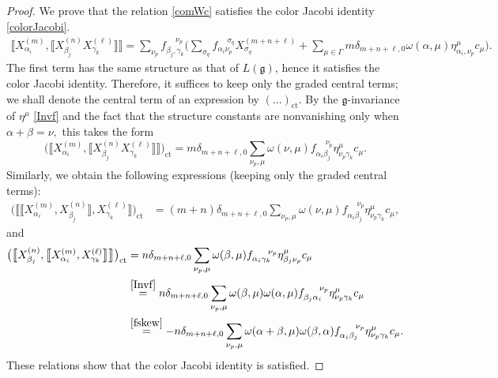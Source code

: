 \documentclass[pdftex]{sigma}
\numberwithin{equation}{section}
\theoremstyle{definition}
\def\nn{\notag}
\def\g{\mathfrak{g}}
\begin{document}
\begin{proof}
	We prove that the relation \eqref{comWc} satisfies the color Jacobi identity \eqref{colorJacobi}.
	\begin{align*}
		\llbracket X_{\alpha_i}^{(m)}, \llbracket X_{\beta_j}^{(n)} X_{\gamma_k}^{(\ell)} \rrbracket \rrbracket
		 = \sum_{\nu_p} f_{\beta_j,\gamma_k}^{\quad \ \nu_p}
		\biggl( \sum_{\sigma_q} f_{\alpha_i \nu_p}^{\quad\ \sigma_q} X_{\sigma_q}^{(m+n+\ell)} + \sum_{\mu \in \Gamma} m \delta_{m+n+\ell,0} \omega(\alpha,\mu) \eta_{\alpha_i,\nu_p}^{\mu} c_{\mu} \biggr).
	\end{align*}
	The first term has the same structure as that of $L(\g)$, hence it satisfies the color Jacobi identity.
	Therefore, it suffices to keep only the graded central terms;
	we shall denote the central term of an expression by $(\ldots)_{\mathrm{ct}}$.
	By the $\g$-invariance of $\eta^{\mu} $ \eqref{Invf} and the fact that the structure constants are nonvanishing only when $ \alpha + \beta = \nu, $ this takes the form
	\begin{equation*}
		\bigl(\bigl\llbracket X_{\alpha_i}^{(m)}, \bigl\llbracket X_{\beta_j}^{(n)} X_{\gamma_k}^{(\ell)} \bigr\rrbracket \bigr\rrbracket \bigr)_{\mathrm{ct}}
		= m \delta_{m+n+\ell,0} \sum_{\nu_p,\mu} \omega(\nu,\mu) f_{\alpha_i \beta_j}^{\quad \ \nu_p} \eta_{\nu_p \gamma_k}^{\mu} c_{\mu}.
	\end{equation*} 	
	Similarly, we obtain the following expressions (keeping only the graded central terms):
	\begin{align*}
\bigl(\bigl\llbracket \bigl\llbracket X_{\alpha_i}^{(m)}, X_{\beta_j}^{(n)} \bigr\rrbracket, X_{\gamma_k}^{(\ell)} \bigr\rrbracket \bigr)_{\mathrm{ct}}
		&= (m+n) \delta_{m+n+\ell,0} \sum_{\nu_p,\mu} \omega(\nu,\mu) f_{\alpha_i \beta_j}^{\quad \ \nu_p} \eta_{\nu_p \gamma_k}^{\mu} c_{\mu},
	\end{align*}
	and
	\begin{align*}
\bigl(\bigl\llbracket X_{\beta_j}^{(n)}, \bigl\llbracket X_{\alpha_i}^{(m)}, X_{\gamma_k}^{(\ell)} \bigr\rrbracket \bigr\rrbracket\bigr)_{\mathrm{ct}}
		&= n \delta_{m+n+\ell,0}\sum_{\nu_p,\mu} \omega(\beta,\mu)f_{\alpha_i \gamma_k}^{\quad \ \nu_p} \eta_{\beta_j \nu_p}^{\mu} c_{\mu}
		\nn\\
		&\stackrel{\eqref{Invf}}{=} n \delta_{m+n+\ell,0}\sum_{\nu_p,\mu} \omega(\beta,\mu) \omega(\alpha,\mu) f_{\beta_j \alpha_i }^{\quad \ \nu_p} \eta_{\nu_p \gamma_k}^{\mu} c_{\mu}
		\nn\\
		&\stackrel{\eqref{fskew}}{=} -n \delta_{m+n+\ell,0}\sum_{\nu_p,\mu} \omega(\alpha+\beta,\mu) \omega(\beta,\alpha) f_{\alpha_i \beta_j }^{\quad \ \nu_p} \eta_{\nu_p \gamma_k}^{\mu} c_{\mu}.
	\end{align*}
	These relations show that the color Jacobi identity is satisfied.
\end{proof}
\end{document}
